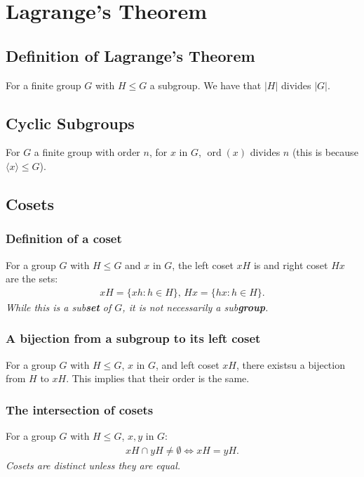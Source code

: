 \documentclass[a4paper, 12pt, twoside]{article}
\DeclareMathOperator{\Ord}{ord}
\begin{document}
\section{Lagrange's Theorem}

\subsection{Definition of Lagrange's Theorem}

For a finite group $G$ with $H \leq G$ a subgroup. We have that
$|H|$ divides $|G|$.

\subsection{Cyclic Subgroups}

For $G$ a finite group with order $n$, for $x$ in $G$, $\Ord(x)$ divides
$n$ (this is because $\langle x \rangle \leq G$).

\subsection{Cosets}

\subsubsection{Definition of a coset}

For a group $G$ with $H \leq G$ and $x$ in $G$, the left coset $xH$ is
and right coset $Hx$ are the sets:
\begin{align*}
      xH = \{xh : h \in H\}, \, Hx = \{hx : h \in H\}.
\end{align*}
\textit{While this is a sub\textbf{set} of $G$, it is not necessarily
      a sub\textbf{group}.}

\subsubsection{A bijection from a subgroup to its left coset}

For a group $G$ with $H \leq G$, $x$ in $G$, and left coset $xH$,
there existsu a bijection from $H$ to $xH$. This implies that their
order is the same.

\subsubsection{The intersection of cosets}

For a group $G$ with $H \leq G$, $x, y$ in $G$:
\begin{align*}
      xH \cap yH \neq \emptyset \Leftrightarrow xH = yH.
\end{align*}
\textit{Cosets are distinct unless they are equal.}
\end{document}
